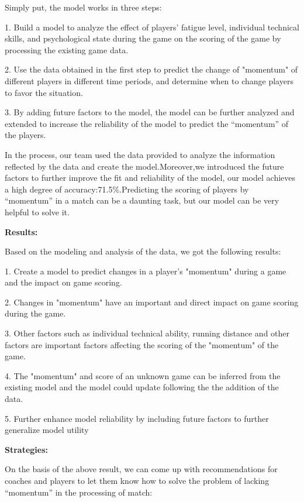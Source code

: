 \documentclass{article}
\begin{document}
Simply put, the model works in three steps:

1. Build a model to analyze the effect of players' fatigue level, individual technical skills, and psychological state during the game on the scoring of the game by processing the existing game data.

2. Use the data obtained in the first step to predict the change of "momentum" of different players in different time periods, and determine when to change players to favor the situation.

3. By adding future factors to the model, the model can be further analyzed and extended to increase the reliability of the model to predict the “momentum” of the players.

In the process, our team used the data provided to analyze the information reflected by the data and create the model.Moreover,we introduced the future factors to further improve the fit and reliability of the model, our model achieves a high degree of accuracy:71.5\%.Predicting the scoring of players by “momentum” in a match can be a daunting task, but our model can be very helpful to solve it.

\begin{center}
      \textbf{Results:}
\end{center}

Based on the modeling and analysis of the data, we got the following results:

1. Create a model to predict changes in a player's "momentum" during a game and the impact on game scoring.

2. Changes in "momentum" have an important and direct impact on game scoring during the game.

3. Other factors such as individual technical ability, running distance and other factors are important factors affecting the scoring of the "momentum" of the game.

4. The "momentum" and score of an unknown game can be inferred from the existing model and the model could update following the the addition of the data.

5. Further enhance model reliability by including future factors to further generalize model utility

\begin{center}
      \textbf{Strategies:}
\end{center}

On the basis of the above result, we can come up with recommendations for coaches and players to let them know how to solve the problem of lacking “momentum” in the processing of match:
\end{document}
